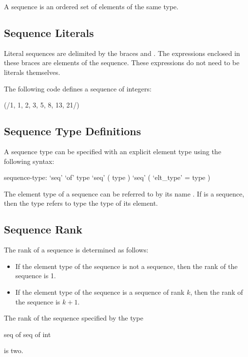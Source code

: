 \label{Sequences}

A sequence is an ordered set of elements of the same type.

\subsection{Sequence Literals}
\label{Sequence_Literals}

Literal sequences are delimited by the braces \chpl{(/} and \chpl{/)}.
The expressions enclosed in these braces are elements of the sequence.
These expressions do not need to be literals themselves.
\begin{example}
The following code defines a sequence of integers:
\begin{chapel}
(/1, 1, 2, 3, 5, 8, 13, 21/)
\end{chapel}
\end{example}

\subsection{Sequence Type Definitions}
\label{Sequence_Type_Definitions}

A sequence type can be specified with an explicit element type using
the following syntax:
\begin{syntax}
sequence-type:
  `seq' `of' type
  `seq' ( type )
  `seq' ( `elt_type' = type )
\end{syntax}

The element type of a sequence can be referred to by its
name .  If  is a sequence, then the
type  refers to type the type of its element.

\subsection{Sequence Rank}
\label{Sequence_Rank}

The rank of a sequence is determined as follows:
\begin{itemize}
\item
If the element type of the sequence is not a sequence, then the rank
of the sequence is 1.
\item
If the element type of the sequence is a sequence of rank $k$, then
the rank of the sequence is $k+1$.
\end{itemize}
\begin{example}
The rank of the sequence specified by the type
\begin{chapel}
  seq of seq of int
\end{chapel}
is two.
\end{example}


